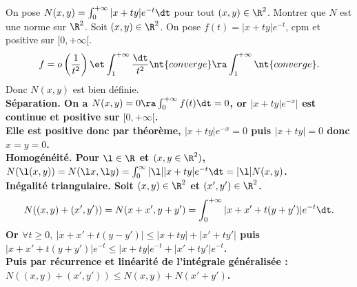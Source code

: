 \documentclass[11pt]{article}
\begin{document}
\begin{exercice}{}{}
    On pose $N(x,y)=\int_0^{+\infty}|x+ty|e^{-t}\dt$ pour tout $(x,y)\in\R^2$. Montrer que $N$ est une norme sur $\R^2$.
    \tcblower
    Soit $(x,y)\in\R^2$. On pose $f(t)=|x+ty|e^{-t}$, cpm et positive sur $[0,+\infty[$.
    \begin{equation*}
        f=o\left(\frac{1}{t^2}\right) \et \int_1^{+\infty}\frac{\dt}{t^2} \nt{ converge } \ra \int_1^{+\infty} \nt{ converge}.
    \end{equation*}
    Donc $N(x,y)$ est bien définie.\\
    \bf{Séparation.} On a $N(x,y)=0\ra\int_0^{+\infty}f(t)\dt=0$, or $|x+ty|e^{-x}|$ est continue et positive sur $[0,+\infty[$.\\
    Elle est positive donc par théorème, $|x+ty|e^{-x}=0$ puis $|x+ty|=0$ donc $x=y=0$.\\
    \bf{Homogénéité.} Pour $\l\in\R$ et $(x,y\in\R^2)$, $N(\l(x,y))=N(\l x,\l y)=\int_0^\infty|\l||x+ty|e^{-t}\dt=|\l|N(x,y)$.\\
    \bf{Inégalité triangulaire.} Soit $(x,y)\in\R^2$ et $(x',y')\in\R^2$.
    \begin{equation*}
        N((x,y)+(x',y')) = N(x+x',y+y')=\int_0^{+\infty}|x+x'+t(y+y')|e^{-t}\dt.
    \end{equation*}
    Or $\forall t \geq 0, ~ |x+x'+t(y-y')|\leq |x+ty|+|x'+ty'|$ puis $|x+x'+t(y+y')|e^{-t}\leq|x+ty|e^{-t}+|x'+ty'|e^{-t}$.\\
    Puis par récurrence et linéarité de l'intégrale généralisée : $N((x,y)+(x',y'))\leq N(x,y)+N(x'+y')$.
\end{exercice}
\end{document}
